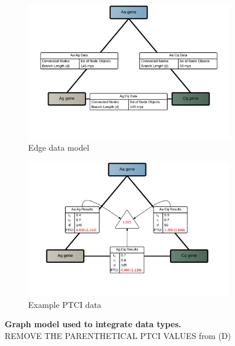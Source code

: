 \begin{figure}[hp]
\begin{subfigure}[t]{.5\linewidth}
    \includegraphics[width=\linewidth]{figures/figs/gfunc_graph_figs/ortho-graph-edge-data.pdf}
    \caption{Edge data model}\label{fig:nway-ortholog-graph-edge-data}
    \end{subfigure}%
% 
% 
%     
    \begin{subfigure}[t]{.5\linewidth}
    \centering
    \includegraphics[width=\linewidth]{figures/figs/gfunc_graph_figs/ortho-graph-ptci.pdf}
    \caption{Example PTCI data}\label{fig:nway-ortholog-graph-ptci}
    \end{subfigure}
% 
% 
% 
\caption[Graph model used to integrate data types]{\sf \textbf{Graph model used to integrate data types.} \\ \alert{REMOVE THE PARENTHETICAL PTCI VALUES from (D)}}\label{fig:nway-ortholog-graph}
\end{figure}